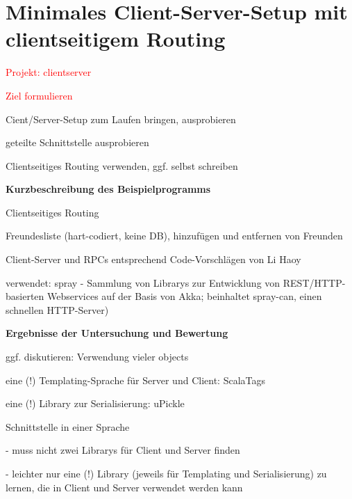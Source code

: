 \documentclass[a4paper, 12pt, hidelinks, listof=totoc, listoftables=totoc, bibliography=totoc]{scrreprt}
\newcommand{\TODO}[1]{\textcolor{red}{#1}\newline}
\newcommand{\MyMiniSec}[1]{\rmfamily\fontsize{12}{15}\selectfont
	\vspace{7pt}\textbf{#1} %
}
\begin{document}
\section{Minimales Client-Server-Setup mit clientseitigem Routing}


\TODO{Projekt: clientserver}


\TODO{Ziel formulieren}

Cient/Server-Setup zum Laufen bringen, ausprobieren

geteilte Schnittstelle ausprobieren

Clientseitiges Routing verwenden, ggf. selbst schreiben

\MyMiniSec{Kurzbeschreibung des Beispielprogramms}

Clientseitiges Routing

Freundesliste (hart-codiert, keine DB), hinzufügen und entfernen von Freunden

Client-Server und RPCs entsprechend Code-Vorschlägen von Li Haoy\cite[]{haoyi.HOS}

verwendet: spray - Sammlung von Librarys zur Entwicklung von REST/HTTP-basierten Webservices auf der Basis von Akka; beinhaltet spray-can, einen schnellen HTTP-Server)

\MyMiniSec{Ergebnisse der Untersuchung und Bewertung}


ggf. diskutieren: Verwendung vieler objects

eine (!) Templating-Sprache für Server und Client: ScalaTags \cite{haoyi.HOS}

eine (!) Library zur Serialisierung: uPickle \cite{haoyi.HOS}

Schnittstelle in einer Sprache

- muss nicht zwei Librarys für Client und Server finden

- leichter nur eine (!) Library (jeweils für Templating und Serialisierung) zu lernen, die in Client und Server verwendet werden kann
\cite[\#SharingCode]{haoyi.HOS}
\end{document}
